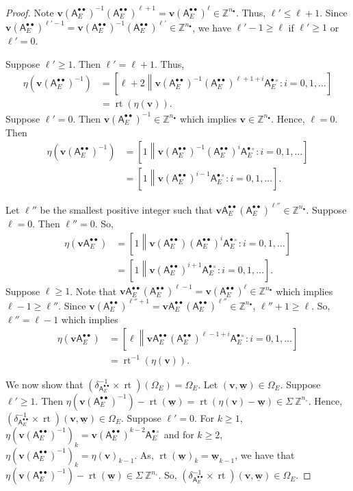 \documentclass[12pt]{amsbook}%
\newcommand{\rt}{\operatorname{rt}}
\theoremstyle{defin}
\theoremstyle{remark}
\numberwithin{equation}{chapter}
\numberwithin{theor}{section}
\newcommand{\ZZ}{\mathbb{Z}}
\newcommand{\nsX}{\Sigma\ }
\newcommand{\oXe}[2]{\left[#1\left\|{#2}\right.\right]}
\newcommand{\regX}{{\bullet}}
\newcommand{\singX}{{\circ}}
\newcommand{\vv}{\mathbf{v}}
\newcommand{\www}{\underline{\mathbf w}}
\newcommand{\nos}{{n_\singX}}
\newcommand{\nor}{{n_\regX}}
\newcommand{\adjRR}{\mathsf{A}^{\bullet\bullet}}
\newcommand{\adjRS}{\mathsf{A}^{\bullet\circ}}
\newcommand{\nDT}{\Omega}
\begin{document}
\begin{proof}
 Note $\vv(\adjRR_E)^{-1} (\adjRR_{E} )^{\ell+1} = \vv (\adjRR_E)^{\ell} \in \ZZ^\nor$.  Thus, $\ell' \leq \ell+1$.  Since 
$ \vv(\adjRR_{E} )^{\ell'-1} = \vv(\adjRR_E)^{-1} (\adjRR_{E} )^{\ell'} \in \ZZ^{\nor}$, we have $\ell'-1 \geq \ell$ if $\ell' \geq 1$ or $\ell' =0$. 

Suppose $\ell' \geq 1$.  Then $\ell' = \ell+1$.  Thus, 
\begin{align*}
\eta(\vv (\adjRR_E)^{-1} ) &= \oXe{\ell+2}{ \vv (\adjRR_E)^{-1} (\adjRR_E)^{\ell+1+i } \adjRS_E : i=0,1,\dots} \\
			&= \rt( \eta( \vv )).
\end{align*}
Suppose $\ell' = 0$.  Then $\vv(\adjRR_E)^{-1} \in \ZZ^{\nor}$ which implies $\vv \in \ZZ^\nor$.  Hence, $\ell = 0$.  Then 
\begin{align*}
\eta(\vv (\adjRR_E)^{-1} )  &= \oXe{1}{ \vv (\adjRR_E)^{-1} (\adjRR_E)^{i } \adjRS_E : i=0,1,\dots} \\
					&= \oXe{1}{\vv(\adjRR_E)^{i-1} \adjRS_E : i=0,1,\dots }. 
\end{align*}


Let $\ell''$ be the smallest positive integer such that $\vv \adjRR_E (\adjRR_E)^{\ell''} \in \ZZ^\nor$.  Suppose $\ell = 0$.  Then $\ell'' = 0$.  So, 
\begin{align*}
\eta(\vv \adjRR_E )  &= \oXe{1}{ \vv (\adjRR_E) (\adjRR_E)^{i } \adjRS_E : i=0,1,\dots} \\
					&= \oXe{1}{\vv(\adjRR_E)^{i+1} \adjRS_E : i=0,1,\dots }. 
\end{align*}
Suppose $\ell \geq 1$.  Note that $\vv \adjRR_E (\adjRR_E)^{\ell-1} = \vv (\adjRR_E)^\ell \in \ZZ^\nor$ which implies $\ell-1 \geq \ell''$.  Since $\vv (\adjRR_E)^{\ell''+1} = \vv \adjRR_E (\adjRR_E)^{\ell''}  \in \ZZ^\nor$, $\ell''+1 \geq \ell$.  So, $\ell'' = \ell-1$ which implies
\begin{align*}
\eta(\vv \adjRR_E) &= \oXe{\ell}{ \vv \adjRR_E (\adjRR_E)^{\ell-1+i}  \adjRS_E : i=0,1, \dots} \\
			&= \rt^{-1}( \eta(\vv)).
\end{align*}

We now show that $(\delta_{\adjRR_E}^{-1} \times \rt) ( \nDT_E) = \nDT_E$.  Let $(\vv, \www) \in \nDT_E$.  Suppose $\ell' \geq 1$.  Then 
$\eta( \vv (\adjRR_E)^{-1}) - \rt(\www) = \rt(\eta(\vv) - \www) \in \nsX\ZZ^\nos$.  Hence, $(\delta_{\adjRR_E}^{-1} \times \rt) (\vv, \www) \in \nDT_E$.  Suppose $\ell' = 0$.  For $k \geq 1$, $\eta(\vv (\adjRR_E)^{-1} )_k  = \vv(\adjRR_E)^{k-2}\adjRS_E$ and for $k \geq 2$, $\eta(\vv (\adjRR_E)^{-1} )_k  = \eta(\vv)_{k-1}$.  As, $\rt(\www)_k = \www_{k-1}$, we have that $\eta(\vv (\adjRR_E)^{-1} ) - \rt(\www)  \in \nsX\ZZ^{\nos}$.  So, $(\delta_{\adjRR_E}^{-1} \times \rt) ( \vv, \www) \in \nDT_E$.


\end{proof}
\end{document}
